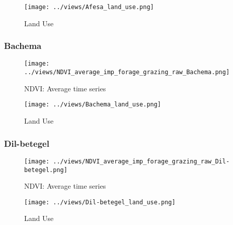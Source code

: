 \documentclass[10pt,a4paper,onecolumn]{article}
\begin{document}
\begin{figure}[H] \centering
  \captionsetup{justification=centering}
\caption{Land Use} 
\centering


\texttt{[image: ../views/Afesa\_land\_use.png]}

\end{figure}





\pagebreak


\subsubsection{Bachema}


\begin{figure}[H] \centering
  \captionsetup{justification=centering}
\caption{NDVI: Average time series } 
\centering


\texttt{[image: ../views/NDVI\_average\_imp\_forage\_grazing\_raw\_Bachema.png]}

\end{figure}

\begin{figure}[H] \centering
  \captionsetup{justification=centering}
\caption{Land Use} 
\centering


\texttt{[image: ../views/Bachema\_land\_use.png]}

\end{figure}




\pagebreak


\subsubsection{Dil-betegel}
\begin{figure}[H] \centering
  \captionsetup{justification=centering}
\caption{NDVI: Average time series } 
\centering


\texttt{[image: ../views/NDVI\_average\_imp\_forage\_grazing\_raw\_Dil-betegel.png]}

\end{figure}


\begin{figure}[H] \centering
  \captionsetup{justification=centering}
\caption{Land Use} 
\centering


\texttt{[image: ../views/Dil-betegel\_land\_use.png]}

\end{figure}
\end{document}
